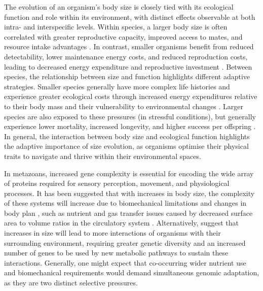 \documentclass[11pt]{article}
\begin{document}
The evolution of an organism's body size is closely tied with its ecological function and role within its environment, with distinct effects observable at both intra- and interspecific levels. Within species, a larger body size is often correlated with greater reproductive capacity, improved access to mates, and resource intake advantages \citep{kemp2003lifetime}. In contrast, smaller organisms benefit from reduced detectability, lower maintenance energy costs, and reduced reproduction costs, leading to decreased energy expenditure and reproductive investment \citep{size-detectability, mass-life-history}. Between species, the relationship between size and function highlights different adaptive strategies. Smaller species generally have more complex life histories and experience greater ecological costs through increased energy expenditures relative to their body mass and their vulnerability to environmental changes \citep{large-small}. Larger species are also exposed to these pressures (in stressful conditions), but generally experience lower mortality, increased longevity, and higher success per offspring \citep{MTE, fast-slow}. In general, the interaction between body size and ecological function highlights the adaptive importance of size evolution, as organisms optimise their physical traits to navigate and thrive within their environmental spaces.

In metazoans, increased gene complexity is essential for encoding the wide array of proteins required for sensory perception, movement, and physiological processes. It has been suggested that with increases in body size, the complexity of these systems will increase due to biomechanical limitations \citep{system-scaling} and changes in body plan \citep{prok-to-human-complexity}, such as nutrient and gas transfer issues caused by decreased surface area to volume ratios in the circulatory system \citep{ruppert1983morphology}. Alternatively, \cite{DeLong} suggest that increases in size will lead to more interactions of organisms with their surrounding environment, requiring greater genetic diversity and an increased number of genes to be used by new metabolic pathways to sustain these interactions. Generally, one might expect that co-occurring wider nutrient use and biomechanical requirements would demand simultaneous genomic adaptation, as they are two distinct selective pressures.
\end{document}
